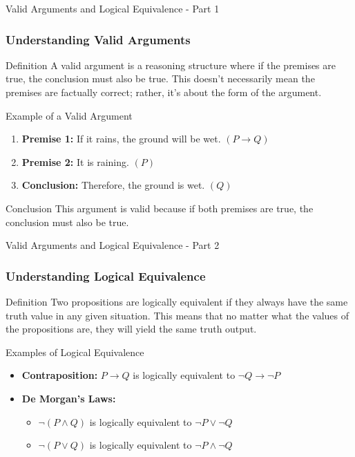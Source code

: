 \documentclass[aspectratio=169]{beamer}
\begin{document}
\begin{frame}[fragile]{Valid Arguments and Logical Equivalence - Part 1}
    \frametitle{Understanding Valid Arguments}
    
    \begin{block}{Definition}
        A valid argument is a reasoning structure where if the premises are true, the conclusion must also be true. 
        This doesn't necessarily mean the premises are factually correct; rather, it's about the form of the argument.
    \end{block}
    
    \begin{exampleblock}{Example of a Valid Argument}
        \begin{enumerate}
            \item \textbf{Premise 1:} If it rains, the ground will be wet. $(P \rightarrow Q)$
            \item \textbf{Premise 2:} It is raining. $(P)$
            \item \textbf{Conclusion:} Therefore, the ground is wet. $(Q)$
        \end{enumerate}
    \end{exampleblock}
    
    \begin{block}{Conclusion}
        This argument is valid because if both premises are true, the conclusion must also be true.
    \end{block}
\end{frame}

\begin{frame}[fragile]{Valid Arguments and Logical Equivalence - Part 2}
    \frametitle{Understanding Logical Equivalence}

    \begin{block}{Definition}
        Two propositions are logically equivalent if they always have the same truth value in any given situation. 
        This means that no matter what the values of the propositions are, they will yield the same truth output.
    \end{block}

    \begin{block}{Examples of Logical Equivalence}
        \begin{itemize}
            \item \textbf{Contraposition:} $P \rightarrow Q$ is logically equivalent to $\neg Q \rightarrow \neg P$
            \item \textbf{De Morgan's Laws:}
                \begin{itemize}
                    \item $\neg (P \land Q)$ is logically equivalent to $\neg P \lor \neg Q$
                    \item $\neg (P \lor Q)$ is logically equivalent to $\neg P \land \neg Q$
                \end{itemize}
        \end{itemize}
    \end{block}
\end{frame}
\end{document}
